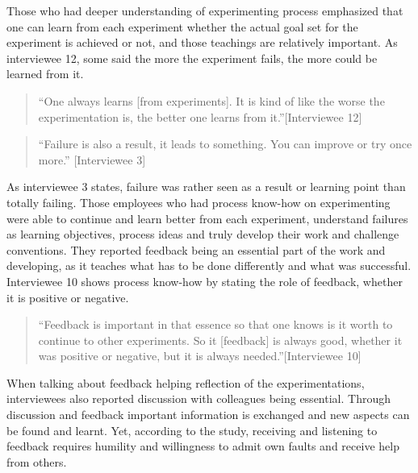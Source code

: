 Those who had deeper understanding of experimenting process emphasized that one can learn from each experiment whether the actual goal set for the experiment is achieved or not, and those teachings are relatively important. As interviewee 12, some said the more the experiment fails, the more could be learned from it. 
\begin{quote}
``One always learns [from experiments]. It is kind of like the worse the experimentation is, the better one learns from it.''[Interviewee 12]
\end{quote}
\begin{quote}
``Failure is also a result, it leads to something. You can improve or try once more.'' [Interviewee 3]
\end{quote}
As interviewee 3 states, failure was rather seen as a result or learning point than totally failing. Those employees who had process know-how on experimenting were able to continue and learn better from each experiment, understand failures as learning objectives, process ideas and truly develop their work and challenge conventions. They reported feedback being an essential part of the work and developing, as it teaches what has to be done differently and what was successful. Interviewee 10 shows process know-how by stating the role of feedback, whether it is positive or negative. 
\begin{quote}
``Feedback is important in that essence so that one knows is it worth to continue to other experiments. So it [feedback] is always good, whether it was positive or negative, but it is always needed.''[Interviewee 10]
\end{quote}
When talking about feedback helping reflection of the experimentations, interviewees also reported discussion with colleagues being essential. Through discussion and feedback important information is exchanged and new aspects can be found and learnt. Yet, according to the study, receiving and listening to feedback requires humility and willingness to admit own faults and receive help from others.


